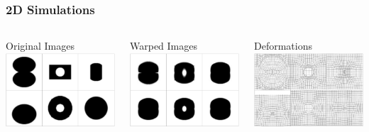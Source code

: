 \documentclass{beamer}
\begin{document}
\begin{frame}
\frametitle{2D Simulations}
\begin{columns}[c]
Original Images\\
\includegraphics[width=\textwidth]{original}

Warped Images\\
\includegraphics[width=\textwidth]{warped}

Deformations\\
\includegraphics[width=\textwidth]{deformations}


\end{columns}
\end{frame}
\end{document}
